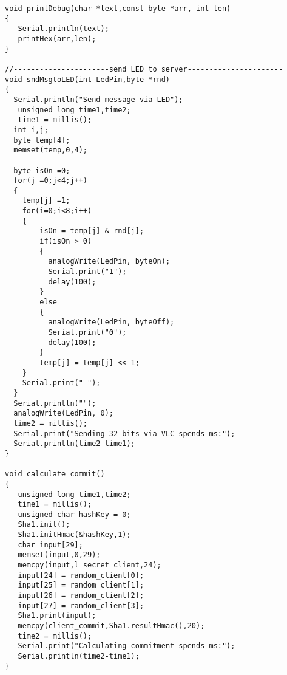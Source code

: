 {\begin{Verbatim}[fontsize=\small]
void printDebug(char *text,const byte *arr, int len)
{
   Serial.println(text);
   printHex(arr,len);
}

//----------------------send LED to server----------------------
void sndMsgtoLED(int LedPin,byte *rnd)
{
  Serial.println("Send message via LED");
   unsigned long time1,time2;
   time1 = millis();
  int i,j;
  byte temp[4];
  memset(temp,0,4);
  
  byte isOn =0;
  for(j =0;j<4;j++)
  {
    temp[j] =1;
    for(i=0;i<8;i++)
    {
        isOn = temp[j] & rnd[j];
        if(isOn > 0)
        {
          analogWrite(LedPin, byteOn);
          Serial.print("1");
          delay(100);
        }
        else
        {
          analogWrite(LedPin, byteOff);
          Serial.print("0");
          delay(100);   
        }
        temp[j] = temp[j] << 1;  
    }
    Serial.print(" ");
  }
  Serial.println("");
  analogWrite(LedPin, 0);
  time2 = millis();
  Serial.print("Sending 32-bits via VLC spends ms:");
  Serial.println(time2-time1);
}

void calculate_commit()
{
   unsigned long time1,time2;
   time1 = millis();
   unsigned char hashKey = 0;
   Sha1.init();
   Sha1.initHmac(&hashKey,1);
   char input[29];
   memset(input,0,29);
   memcpy(input,l_secret_client,24);
   input[24] = random_client[0];
   input[25] = random_client[1];
   input[26] = random_client[2];
   input[27] = random_client[3];
   Sha1.print(input);     
   memcpy(client_commit,Sha1.resultHmac(),20);
   time2 = millis();
   Serial.print("Calculating commitment spends ms:");
   Serial.println(time2-time1);
}
\end{Verbatim}
}

